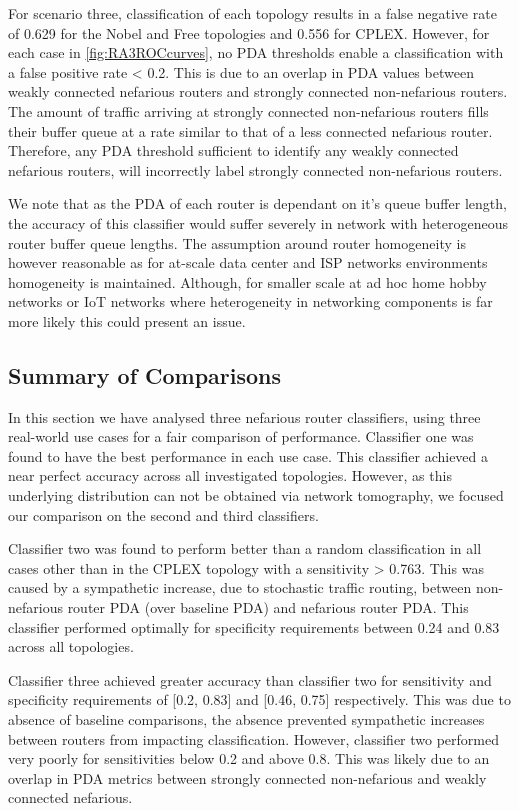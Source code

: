 For scenario three, classification of each topology results in a false negative rate of 0.629 for the Nobel and Free topologies and 0.556 for CPLEX. However, for each case in \cref{fig:RA3ROCcurves}, no PDA thresholds enable a classification with a false positive rate < 0.2. This is due to an overlap in PDA values between weakly connected nefarious routers and strongly connected non-nefarious routers. The amount of traffic arriving at strongly connected non-nefarious routers fills their buffer queue at a rate similar to that of a less connected nefarious router. Therefore, any PDA threshold sufficient to identify any weakly connected nefarious routers, will incorrectly label strongly connected non-nefarious routers.\par
We note that as the PDA of each router is dependant on it's queue buffer length, the accuracy of this classifier would suffer severely in network with heterogeneous router buffer queue lengths. The assumption around router homogeneity is however reasonable as for at-scale data center and ISP networks environments homogeneity is maintained. Although, for smaller scale at ad hoc home hobby networks or IoT networks where heterogeneity in networking components is far more likely this could present an issue. 

\subsection{Summary of Comparisons}
\label{ssec:Rnefidsummary}
In this section we have analysed three nefarious router classifiers, using three real-world use cases for a fair comparison of performance. Classifier one was found to have the best performance in each use case. This classifier achieved a near perfect accuracy across all investigated topologies. However, as this underlying distribution can not be obtained via network tomography, we focused our comparison on the second and third classifiers.\par
Classifier two was found to perform better than a random classification in all cases other than in the CPLEX topology with a sensitivity > 0.763. This was caused by a sympathetic increase, due to stochastic traffic routing, between non-nefarious router PDA (over baseline PDA) and nefarious router PDA. This classifier performed optimally for specificity requirements between 0.24 and 0.83 across all topologies.\par
Classifier three achieved greater accuracy than classifier two for sensitivity and specificity requirements of [0.2, 0.83] and [0.46, 0.75] respectively. This was due to absence of baseline comparisons, the absence prevented sympathetic increases between routers from impacting classification. However, classifier two performed very poorly for sensitivities below 0.2 and above 0.8. This was likely due to an overlap in PDA metrics between strongly connected non-nefarious and weakly connected nefarious.

